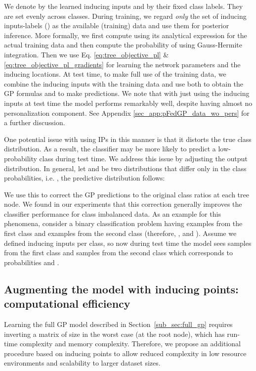 \documentclass{article}
\def\Secref#1{Section~\ref{#1}}
\begin{document}
We denote by  the learned inducing inputs and by  their fixed class labels. They are set evenly across classes. During training, we  regard \textit{only} the set of inducing inputs-labels () as the available (training) data and use them for posterior inference. More formally, we first compute   using its analytical expression for the actual training data and then compute the probability of  using Gauss-Hermite integration. Then we use Eq. \ref{eq:tree_objective_pl} \& \ref{eq:tree_objective_pl_gradients} for learning the network parameters and the inducing locations.
At test time, to make full use of the training data, we combine the inducing inputs with the training data and use both to obtain the GP formulas and to make predictions. We note that with just using the inducing inputs at test time the model performs remarkably well, despite having almost no personalization component.
See Appendix \ref{sec_app:pFedGP_data_wo_pers} for a further discussion.





One potential issue with using IPs in this manner is that it distorts the true class distribution. As a result, the classifier may be more likely to predict a low-probability class during test time. 
We address this issue by adjusting the output distribution. In general, let  and  be two distributions that differ only in the class probabilities, i.e. , the predictive distribution follows:

We use this to correct the GP predictions to the original class ratios at each tree node. We found in our experiments that this correction generally improves the classifier performance for class imbalanced data. As an example for this phenomena, consider a binary classification problem having  examples from the first class and  examples from the second class (therefore, , and ). Assume we defined  inducing inputs per class, so now during test time the model sees  samples from the first class and  samples from the second class which corresponds to probabilities  and .





\subsection{Augmenting the model with inducing points: computational efficiency} \label{subsec_method:gp_IP-compute}
Learning the full GP model described in \Secref{sub_sec:full_gp} requires inverting a matrix of size  in the worst case (at the root node), which has  run-time complexity and  memory complexity. Therefore, we propose an additional procedure based on inducing points to allow reduced complexity in low resource environments and scalability to larger dataset sizes.
\end{document}
